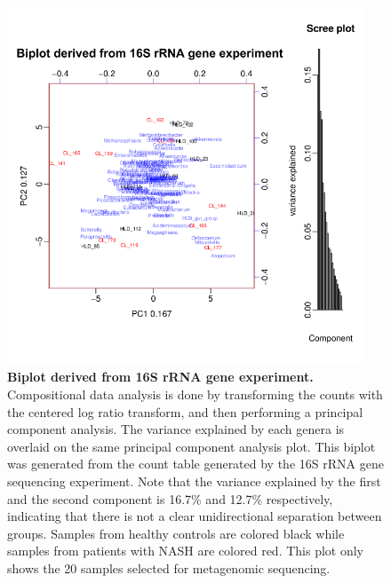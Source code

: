 \begin{figure}[h]
\begin{center}
\includegraphics[width=0.95\textwidth]{16S_metagenomic_biplot.png}
\caption[Biplot derived from 16S rRNA gene experiment.]{\textbf{Biplot derived from 16S rRNA gene experiment.} Compositional data analysis is done by transforming the counts with the centered log ratio transform, and then performing a principal component analysis. The variance explained by each genera is overlaid on the same principal component analysis plot. This biplot was generated from the count table generated by the 16S rRNA gene sequencing experiment. Note that the variance explained by the first and the second component is 16.7\% and 12.7\% respectively, indicating that there is not a clear unidirectional separation between groups. Samples from healthy controls are colored black while samples from patients with NASH are colored red. This plot only shows the 20 samples selected for metagenomic sequencing.}
\label{nafld_16s_metagenomic_biplot}
\end{center}
\end{figure}

